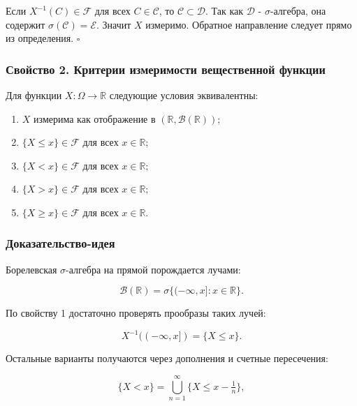 \documentclass[
  11pt,
  a4paper,
]{article}
\providecommand{\tightlist}{%
  \setlength{\itemsep}{0pt}\setlength{\parskip}{0pt}}
\begin{document}
Если \(X^{-1}(C)\in\mathcal F\) для всех \(C\in\mathcal C\), то
\(\mathcal C\subset\mathcal D\). Так как \(\mathcal D\) -
\(\sigma\)-алгебра, она содержит \(\sigma(\mathcal C)=\mathcal E\).
Значит \(X\) измеримо. Обратное направление следует прямо из
определения. \(\square\)

\subsubsection{Свойство 2. Критерии измеримости вещественной
функции}\label{ux441ux432ux43eux439ux441ux442ux432ux43e-2.-ux43aux440ux438ux442ux435ux440ux438ux438-ux438ux437ux43cux435ux440ux438ux43cux43eux441ux442ux438-ux432ux435ux449ux435ux441ux442ux432ux435ux43dux43dux43eux439-ux444ux443ux43dux43aux446ux438ux438}

Для функции \(X:\Omega\to\mathbb R\) следующие условия эквивалентны:

\begin{enumerate}
\def\labelenumi{\arabic{enumi}.}
\tightlist
\item
  \(X\) измерима как отображение в
  \((\mathbb R,\mathcal B(\mathbb R))\);
\item
  \(\{X\le x\}\in\mathcal F\) для всех \(x\in\mathbb R\);
\item
  \(\{X<x\}\in\mathcal F\) для всех \(x\in\mathbb R\);
\item
  \(\{X>x\}\in\mathcal F\) для всех \(x\in\mathbb R\);
\item
  \(\{X\ge x\}\in\mathcal F\) для всех \(x\in\mathbb R\).
\end{enumerate}

\subsubsection{Доказательство-идея}\label{ux434ux43eux43aux430ux437ux430ux442ux435ux43bux44cux441ux442ux432ux43e-ux438ux434ux435ux44f}

Борелевская \(\sigma\)-алгебра на прямой порождается лучами:

\[
\mathcal B(\mathbb R)=\sigma\{(-\infty,x]:x\in\mathbb R\}.
\]

По свойству 1 достаточно проверять прообразы таких лучей:

\[
X^{-1}((-\infty,x])=\{X\le x\}.
\]

Остальные варианты получаются через дополнения и счетные пересечения:

\[
\{X<x\}=\bigcup_{n=1}^{\infty}\{X\le x-\tfrac1n\},
\]
\end{document}
